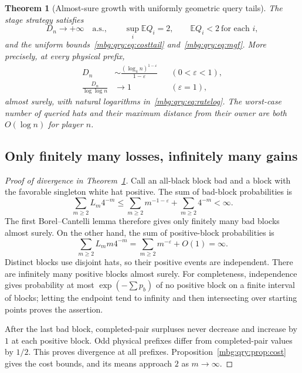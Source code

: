 \documentclass[11pt,letterpaper]{article}
\newtheorem{theorem}{Theorem}[section]
\theoremstyle{definition}
\newcommand{\E}{\mathbb E}
\newcommand{\as}{\text{a.s.}}
\begin{document}
\begin{theorem}[Almost-sure growth with uniformly geometric query tails]
\label{mbg:qry:thm:construction}
The stage strategy satisfies
\[
 D_n\to+\infty\quad\as,\qquad
 \sup_i\E Q_i=2,\qquad
 \E Q_i<2\ \text{for each }i,
\]
and the uniform bounds~\eqref{mbg:qry:eq:costtail} and~\eqref{mbg:qry:eq:mgf}.
More precisely, at every physical prefix,
\begin{align}
 D_n&\sim\frac{(\log_4 n)^{1-\varepsilon}}{1-\varepsilon}
 &&(0<\varepsilon<1), \label{mbg:qry:eq:ratepower}\\
 \frac{D_n}{\log\log n}&\longrightarrow1
 &&(\varepsilon=1), \label{mbg:qry:eq:ratelog}
\end{align}
almost surely, with natural logarithms in~\eqref{mbg:qry:eq:ratelog}.
The worst-case number of queried hats and their maximum distance from
their owner are both \(O(\log n)\) for player \(n\).
\end{theorem}

\subsection{Only finitely many losses, infinitely many gains}

\begin{proof}[Proof of divergence in Theorem~\ref{mbg:qry:thm:construction}]
Call an all-black block bad and a block with the favorable singleton
white hat positive. The sum of bad-block probabilities is
\[
 \sum_{m\ge2}L_m4^{-m}
 \le \sum_{m\ge2}m^{-1-\varepsilon}+\sum_{m\ge2}4^{-m}<\infty.
\]
The first Borel--Cantelli lemma therefore gives only finitely many bad
blocks almost surely.
On the other hand, the sum of positive-block probabilities is
\[
 \sum_{m\ge2}L_m m4^{-m}
 =\sum_{m\ge2}m^{-\varepsilon}+O(1)=\infty.
\]
Distinct blocks use disjoint hats, so their positive events are
independent. There are infinitely many positive blocks almost surely.
For completeness, independence gives probability at most
\(\exp(-\sum p_b)\) of no positive block on a finite interval of blocks;
letting the endpoint tend to infinity and then intersecting over
starting points proves the assertion.

After the last bad block, completed-pair surpluses never decrease and
increase by \(1\) at each positive block. Odd physical prefixes differ
from completed-pair values by \(1/2\).
This proves divergence at all prefixes. Proposition~\ref{mbg:qry:prop:cost}
gives the cost bounds, and its means approach \(2\) as \(m\to\infty\).
\end{proof}
\end{document}
